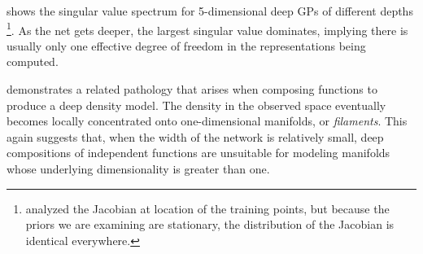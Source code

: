 %
 shows the singular value spectrum for 5-dimensional deep GPs of different depths
\footnote{\citet{rifai2011contractive} analyzed the Jacobian at location of the training points, but because the priors we are examining are stationary, the distribution of the Jacobian is identical everywhere.}.
As the net gets deeper, the largest singular value dominates, implying there is usually only one effective degree of freedom in the representations being computed.

 demonstrates a related pathology that arises when composing functions to produce a deep density model.
The density in the observed space eventually becomes locally concentrated onto one-dimensional manifolds, or \emph{filaments}.
This again suggests that, when the width of the network is relatively small, deep compositions of independent functions are unsuitable for modeling manifolds whose underlying dimensionality is greater than one.

